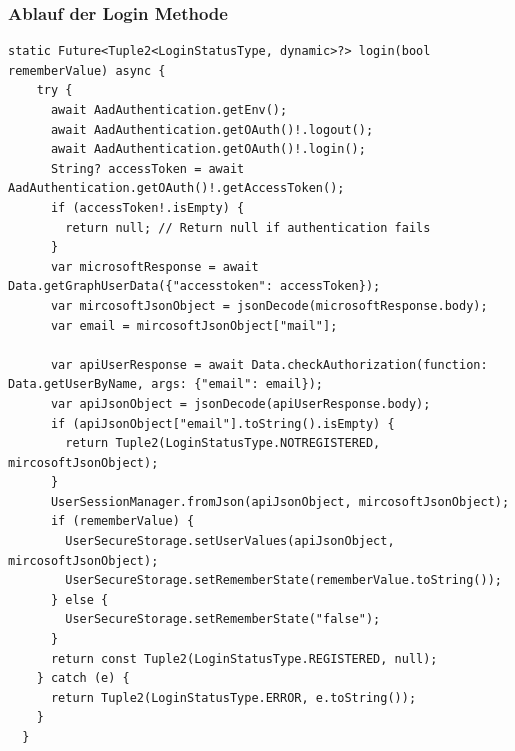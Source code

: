 \subsubsection{Ablauf der Login Methode}
\begin{lstlisting}[caption=Methode login in Klasse UserSessionManager,style=goMono]
  static Future<Tuple2<LoginStatusType, dynamic>?> login(bool rememberValue) async {
    try {
      await AadAuthentication.getEnv();
      await AadAuthentication.getOAuth()!.logout();
      await AadAuthentication.getOAuth()!.login();
      String? accessToken = await AadAuthentication.getOAuth()!.getAccessToken();
      if (accessToken!.isEmpty) {
        return null; // Return null if authentication fails
      }
      var microsoftResponse = await Data.getGraphUserData({"accesstoken": accessToken});
      var mircosoftJsonObject = jsonDecode(microsoftResponse.body);
      var email = mircosoftJsonObject["mail"];

      var apiUserResponse = await Data.checkAuthorization(function: Data.getUserByName, args: {"email": email});
      var apiJsonObject = jsonDecode(apiUserResponse.body);
      if (apiJsonObject["email"].toString().isEmpty) {
        return Tuple2(LoginStatusType.NOTREGISTERED, mircosoftJsonObject);
      }
      UserSessionManager.fromJson(apiJsonObject, mircosoftJsonObject);
      if (rememberValue) {
        UserSecureStorage.setUserValues(apiJsonObject, mircosoftJsonObject);
        UserSecureStorage.setRememberState(rememberValue.toString());
      } else {
        UserSecureStorage.setRememberState("false");
      }
      return const Tuple2(LoginStatusType.REGISTERED, null);
    } catch (e) {
      return Tuple2(LoginStatusType.ERROR, e.toString());
    }
  }
\end{lstlisting}
